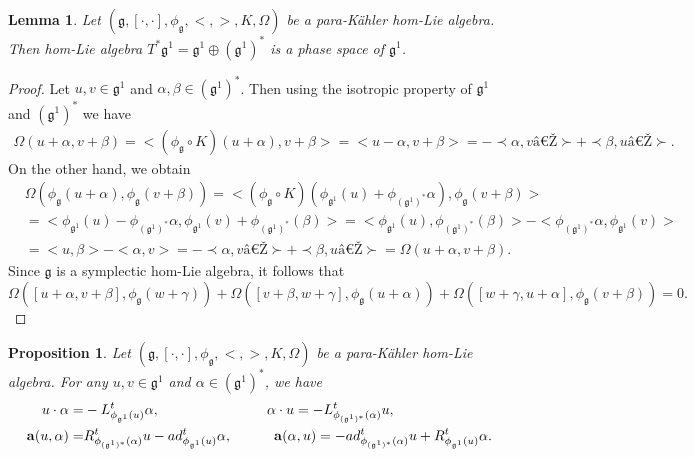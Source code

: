 \documentclass[10pt]{amsart}
\numberwithin{equation}{section}
\newtheorem{lemma}[theorem]{Lemma}
\newtheorem{proposition}[theorem]{Proposition}
\begin{document}
\begin{lemma}
Let $(\mathfrak{g}, [\cdot, \cdot], \phi_{\mathfrak{g}}, <,>, K,\Omega)$ be a para-K\"{a}hler hom-Lie algebra. Then hom-Lie algebra $T^*\mathfrak{g}^1=\mathfrak{g}^1\oplus(\mathfrak{g}^1)^*$ is a phase space of $\mathfrak{g}^1$.
\end{lemma}
\begin{proof}
Let $u,v\in\mathfrak{g}^1$ and $\alpha,\beta\in(\mathfrak{g}^1)^*$. Then using the isotropic property of $\mathfrak{g}^1$ and $(\mathfrak{g}^1)^*$ we have
\begin{align*}
\Omega(u+\alpha,v+\beta)=<(\phi_{\mathfrak{g}}\circ K)(u+\alpha),v+\beta>=<u-\alpha,v+\beta>=-\prec\alpha,vâ\succ+\prec\beta,uâ\succ.
\end{align*}
On the other hand, we obtain
\begin{align*}
&\Omega(\phi_{\mathfrak{g}}(u+\alpha),\phi_{\mathfrak{g}}(v+\beta))=<(\phi_{\mathfrak{g}}\circ K)(\phi_{\mathfrak{g}^1}(u)+\phi_{(\mathfrak{g}^1)^*}\alpha),\phi_{\mathfrak{g}}(v+\beta)>\\
&=<\phi_{\mathfrak{g}^1}(u)-\phi_{(\mathfrak{g}^1)^*}\alpha,\phi_{\mathfrak{g}^1}(v)+\phi_{(\mathfrak{g}^1)^*}(\beta)>=<\phi_{\mathfrak{g}^1}(u),\phi_{(\mathfrak{g}^1)^*}(\beta)>-<\phi_{(\mathfrak{g}^1)^*}\alpha,\phi_{\mathfrak{g}^1}(v)>\\
&=<u,\beta>-<\alpha,v>=-\prec\alpha,vâ\succ+\prec\beta,uâ\succ=\Omega(u+\alpha,v+\beta).
\end{align*}
Since $\mathfrak{g}$ is a symplectic hom-Lie algebra, it follows that 
\[
\Omega([u+\alpha,v+\beta],\phi_\mathfrak{g}(w+\gamma))+\Omega([v+\beta,w+\gamma],\phi_\mathfrak{g}(u+\alpha))+\Omega([w+\gamma,u+\alpha],\phi_\mathfrak{g}(v+\beta))=0.
\] 
\end{proof}
\begin{proposition}
Let $(\mathfrak{g}, [\cdot, \cdot], \phi_{\mathfrak{g}}, <,>, K,\Omega)$ be a para-K\"{a}hler hom-Lie algebra. For any $u,v\in \mathfrak{g}^1$ and $\alpha\in(\mathfrak{g}^{1})^*$, we have 
\begin{align*}
u\cdot \alpha=&-L^t_{ \phi_{\mathfrak{g}^1}(u)}\alpha,\ \ \ \ \ \ \ \ \ \ \ \ \ \ \ \ \ \ \ \ \ \ \ \alpha\cdot u=-L^t_{ \phi_{(\mathfrak{g}^1)^*}(\alpha)} u,\\
\bold{a}(u, \alpha)=&R_{{ \phi_{(\mathfrak{g}^1)^*}(\alpha)}}^tu-ad^t_{ \phi_{\mathfrak{g}^1}(u)}\alpha, \ \ \ \ \ \ \ \ \ \bold{a}(\alpha,u)=-ad^t_{ \phi_{(\mathfrak{g}^1)^*}(\alpha)} u+R^t_{ \phi_{\mathfrak{g}^1}(u)}\alpha.
\end{align*}
\end{proposition}
\end{document}

